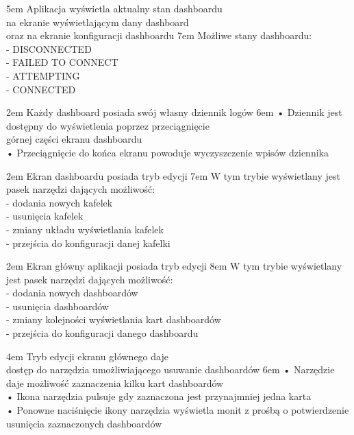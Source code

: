 {5em}{
    Aplikacja wyświetla aktualny stan dashboardu\\
    na ekranie wyświetlającym dany dashboard\\
    oraz na ekranie konfiguracji dashboardu
}
{7em}{
    Możliwe stany dashboardu:\\
    - DISCONNECTED\\
    - FAILED TO CONNECT\\
    - ATTEMPTING\\
    - CONNECTED
}

{2em}{
    Każdy dashboard posiada swój własny dziennik logów
}
{6em}{
    • Dziennik jest dostępny do wyświetlenia poprzez przeciągnięcie\\
    \hspace*{0.5em} górnej części ekranu dashboardu\\

    • Przeciągnięcie do końca ekranu powoduje wyczyszczenie wpisów dziennika
}

{2em}{
    Ekran dashboardu posiada tryb edycji
}
{7em}{
    W tym trybie wyświetlany jest pasek narzędzi dających możliwość:\\
    - dodania nowych kafelek\\
    - usunięcia kafelek\\
    - zmiany układu wyświetlania kafelek\\
    - przejścia do konfiguracji danej kafelki
}

{2em}{
    Ekran główny aplikacji posiada tryb edycji
}
{8em}{
    W tym trybie wyświetlany jest pasek narzędzi dających możliwość:\\
    - dodania nowych dashboardów\\
    - usunięcia dashboardów\\
    - zmiany kolejności wyświetlania kart dashboardów\\
    - przejścia do konfiguracji danego dashboardu
}

{4em}{
    Tryb edycji ekranu głównego daje\\
    dostęp do narzędzia umożliwiającego usuwanie dashboardów
}
{6em}{
    • Narzędzie daje możliwość zaznaczenia kilku kart dashboardów\\
    • Ikona narzędzia pulsuje gdy zaznaczona jest przynajmniej jedna karta\\
    • Ponowne naciśnięcie ikony narzędzia wyświetla monit z prośbą o potwierdzenie\\
    \hspace*{0.5em} usunięcia zaznaczonych dashboardów
}

